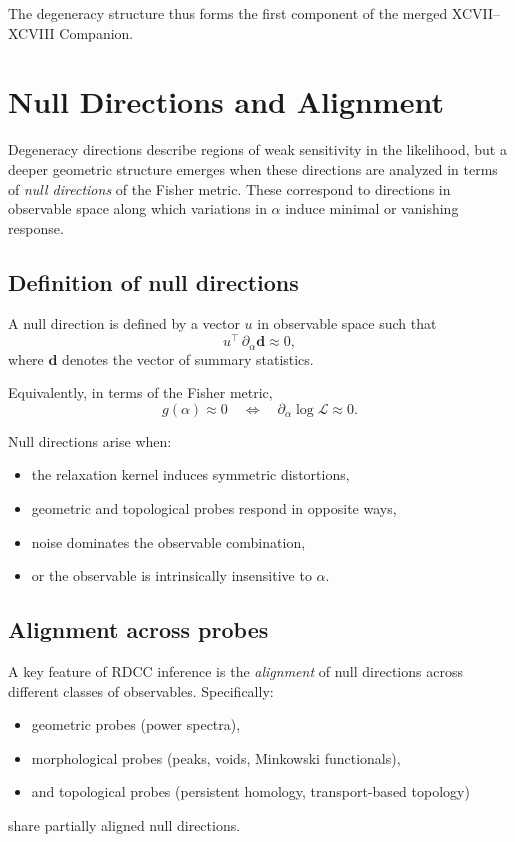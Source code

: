 \documentclass[11pt,a4paper]{article}
\begin{document}
The degeneracy structure thus forms the first component of the merged 
XCVII--XCVIII Companion.
\section{Null Directions and Alignment}

Degeneracy directions describe regions of weak sensitivity in the likelihood, 
but a deeper geometric structure emerges when these directions are analyzed in 
terms of \emph{null directions} of the Fisher metric. These correspond to 
directions in observable space along which variations in $\alpha$ induce 
minimal or vanishing response.

\subsection{Definition of null directions}

A null direction is defined by a vector $u$ in observable space such that
\begin{equation}
u^\top \, \partial_\alpha \mathbf{d} \approx 0,
\end{equation}
where $\mathbf{d}$ denotes the vector of summary statistics.

Equivalently, in terms of the Fisher metric,
\begin{equation}
g(\alpha) \approx 0
\quad \Longleftrightarrow \quad
\partial_\alpha \log \mathcal{L} \approx 0.
\end{equation}

Null directions arise when:
\begin{itemize}
    \item the relaxation kernel induces symmetric distortions,
    \item geometric and topological probes respond in opposite ways,
    \item noise dominates the observable combination,
    \item or the observable is intrinsically insensitive to $\alpha$.
\end{itemize}

\subsection{Alignment across probes}

A key feature of RDCC inference is the \emph{alignment} of null directions 
across different classes of observables. Specifically:
\begin{itemize}
    \item geometric probes (power spectra),
    \item morphological probes (peaks, voids, Minkowski functionals),
    \item and topological probes (persistent homology, transport-based topology)
\end{itemize}
share partially aligned null directions.
\end{document}

